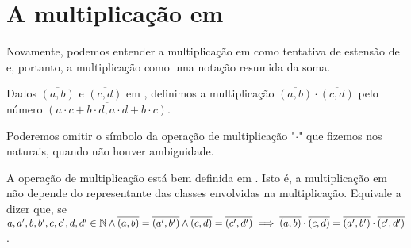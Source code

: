 \documentclass[../main.tex]{subfiles}
\begin{document}
\section{A multiplicação em \Z}
Novamente, podemos entender a multiplicação em \Z como tentativa de estensão de \N e, portanto, a multiplicação como uma notação resumida da soma.
\begin{defi}
    Dados $\overline{(a,b)}$ e $\overline{(c,d)}$ em \Z, definimos a multiplicação $\overline{(a,b)} \cdot \overline{(c,d)}$ pelo número $\overline{(a \cdot c + b \cdot d, a \cdot d + b \cdot c)}$.
\end{defi}
\begin{obs}
    Poderemos omitir o símbolo da operação de multiplicação "$\cdot$" que fizemos nos naturais, quando não houver ambiguidade.
\end{obs}
\begin{teo}
    A operação de multiplicação está bem definida em \Z. Isto é, a multiplicação em \Z não depende do representante das classes envolvidas na multiplicação. Equivale a dizer que, se \\
    $a,a',b,b',c,c',d,d' \in \mathbb{N} \land \overline{(a,b)} = \overline{(a',b')} \land \overline{(c,d)} = \overline{(c',d')}
    \implies \overline{(a,b)} \cdot \overline{(c,d)} = \overline{(a',b')} \cdot \overline{(c',d')} $.
\end{teo}
\end{document}
